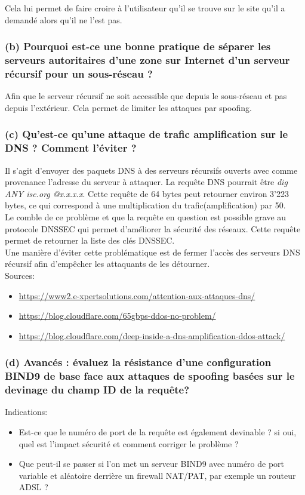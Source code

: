 \documentclass{article}
\begin{document}
Cela lui permet de faire croire à l'utilisateur qu'il se trouve sur le site qu'il a demandé alors qu'il ne l'est pas.

\subsubsection*{(b) Pourquoi est-ce une bonne pratique de séparer les serveurs autoritaires d’une zone sur Internet d’un serveur récursif pour un sous-réseau ?}
Afin que le serveur récursif ne soit accessible que depuis le sous-réseau et pas depuis l'extérieur. Cela permet de limiter les attaques par spoofing.

\subsubsection*{(c) Qu’est-ce qu’une attaque de trafic amplification sur le DNS ? Comment l’éviter ?}
Il s'agit d'envoyer des paquets DNS à des serveurs récursifs ouverts avec comme provenance l'adresse du serveur à attaquer. La requête DNS pourrait être \textit{dig ANY isc.org @x.x.x.x}. Cette requête de 64 bytes peut retourner environ 3'223 bytes, ce qui correspond à une multiplication du  trafic(amplification) par 50.\\

Le comble de ce problème et que la requête en question est possible grave au protocole DNSSEC qui permet d'améliorer la sécurité des réseaux. Cette requête permet de retourner la liste des clés DNSSEC.\\

Une manière d'éviter cette problématique est de fermer l'accès des serveurs DNS récursif afin d'empêcher les attaquants de les détourner.\\

Sources:
\begin{itemize}
\item \url{https://www2.e-xpertsolutions.com/attention-aux-attaques-dns/}
\item \url{https://blog.cloudflare.com/65gbps-ddos-no-problem/}
\item \url{https://blog.cloudflare.com/deep-inside-a-dns-amplification-ddos-attack/}
\end{itemize}

\subsubsection*{(d) Avancés : évaluez la résistance d’une configuration BIND9 de base face aux attaques de spoofing basées sur le devinage du champ ID de la requête?}
Indications:
\begin{itemize}
\item Est-ce que le numéro de port de la requête est également devinable ? si oui, quel est l’impact sécurité et comment corriger le problème ?
\item Que peut-il se passer si l’on met un serveur BIND9 avec numéro de port variable et aléatoire derrière un firewall NAT/PAT, par exemple un routeur ADSL ?
\end{itemize}
\end{document}
